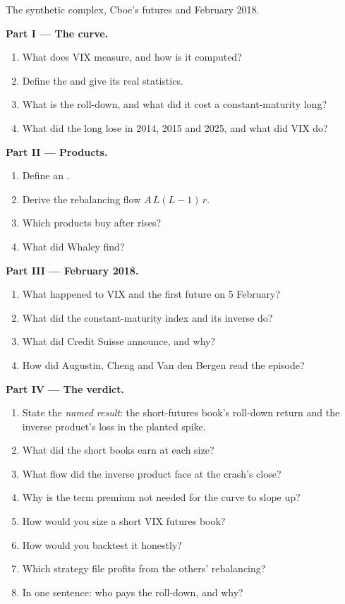 \begin{problem}\label{pb:s2:the-volatility-index-complex:1}
The synthetic complex, Cboe's futures and February 2018.

\medskip\noindent\textbf{Part I --- The curve.}
\begin{enumerate}
\item What does VIX measure, and how is it computed?
\item Define the  and give its real statistics.
\item What is the roll-down, and what did it cost a constant-maturity long?
\item What did the long lose in 2014, 2015 and 2025, and what did VIX do?
\end{enumerate}

\medskip\noindent\textbf{Part II --- Products.}
\begin{enumerate}[resume]
\item Define an .
\item Derive the rebalancing flow $A\,L(L - 1)\,r$.
\item Which products buy after rises?
\item What did Whaley find?
\end{enumerate}

\medskip\noindent\textbf{Part III --- February 2018.}
\begin{enumerate}[resume]
\item What happened to VIX and the first future on 5 February?
\item What did the constant-maturity index and its inverse do?
\item What did Credit Suisse announce, and why?
\item How did Augustin, Cheng and Van den Bergen read the episode?
\end{enumerate}

\medskip\noindent\textbf{Part IV --- The verdict.}
\begin{enumerate}[resume]
\item State the \emph{named result}: the short-futures book's roll-down return and the inverse product's loss in the planted spike.
\item What did the short books earn at each size?
\item What flow did the inverse product face at the crash's close?
\item Why is the term premium not needed for the curve to slope up?
\item How would you size a short VIX futures book?
\item How would you backtest it honestly?
\item Which strategy file profits from the others' rebalancing?
\item In one sentence: who pays the roll-down, and why?
\end{enumerate}
\end{problem}

